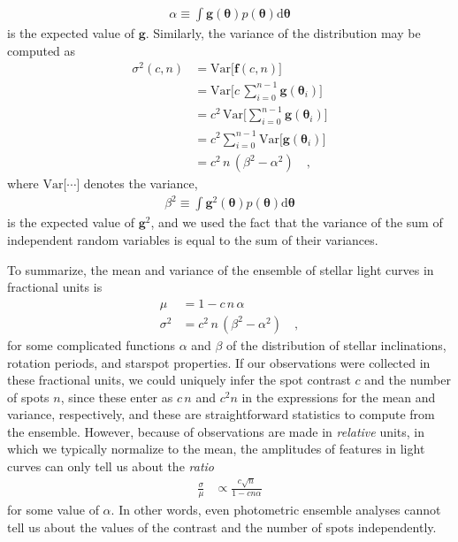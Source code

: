 \documentclass[modern]{aastex62}
\begin{document}
%
\begin{align}
    \alpha \equiv \int \mathbf{g} (\pmb{\theta}) p(\pmb{\theta}) \mathrm{d} \pmb{\theta}
\end{align}
%
is the expected value of $\mathbf{g}$.
%
Similarly, the variance of the distribution may be computed as
%
\begin{align}
    \sigma^2(c, n) & = \mathrm{Var} \Big[ \mathbf{f}(c, n) \Big] \nonumber                         \nonumber \\
                   & = \mathrm{Var} \Big[ c \, \sum_{i=0}^{n-1} \mathbf{g}(\pmb{\theta}_i) \Big]   \nonumber \\
                   & = c^2 \, \mathrm{Var} \Big[ \sum_{i=0}^{n-1} \mathbf{g}(\pmb{\theta}_i) \Big] \nonumber \\
                   & = c^2 \sum_{i=0}^{n-1} \mathrm{Var} \Big[  \mathbf{g}(\pmb{\theta}_i) \Big]   \nonumber \\
                   & = c^2 \, n \, (\beta^2 - \alpha^2)
    \quad,
\end{align}
%
where $\mathrm{Var}\big[\cdots\big]$ denotes the variance,
%
\begin{align}
    \beta^2 \equiv \int \mathbf{g}^2 (\pmb{\theta}) p(\pmb{\theta}) \mathrm{d} \pmb{\theta}
\end{align}
%
is the expected value of $\mathbf{g}^2$, and we used the fact that the variance
of the sum of independent random variables is equal to the sum of their variances.

%

To summarize, the mean and variance of the ensemble of stellar light curves
in fractional units is
%
\begin{align}
    \mu      & = 1 - c \, n \, \alpha
    \nonumber                                     \\
    \sigma^2 & = c^2 \, n \, (\beta^2 - \alpha^2)
    \quad,
\end{align}
%
for some complicated functions $\alpha$ and $\beta$ of the distribution of
stellar inclinations,
rotation periods, and starspot properties.
%
If our observations were collected in these fractional units,
we could uniquely infer the spot contrast $c$ and the number of spots $n$,
since these enter as $c \, n$ and $c^2 n$ in the expressions for the mean
and variance, respectively, and these are straightforward statistics to
compute from the ensemble.
%
However, because of observations are made in \emph{relative} units, in which
we typically normalize to the mean, the amplitudes of features in light curves
can only tell us about the \emph{ratio}
%
\begin{align}
    \label{eq:ratio}
    \frac{\sigma}{\mu}
     & \propto \frac{c \sqrt{n}}{1 - c n \alpha}
\end{align}
%
for some value of $\alpha$.
In other words, even photometric ensemble analyses cannot tell
us about the values of the contrast and the number of spots independently.
\end{document}
